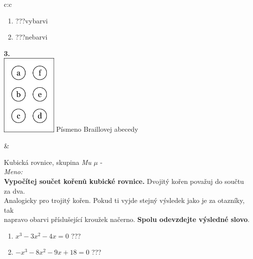 \documentclass[10pt]{report}
\begin{document}
\begin{tabular}{c:c}
\begin{minipage}[c][99mm][t]{0.49\linewidth}
\begin{center}
\begin{minipage}{0.77\linewidth}
\begin{center}
\begin{varwidth}{\textwidth}
\begin{enumerate}
\item \quad \dotfill\; ???\;\dotfill \quad vybarvi
\item \quad \dotfill\; ???\;\dotfill \quad nebarvi
\end{enumerate}
\end{varwidth}
\end{center}
\end{minipage}
\begin{minipage}{0.20\linewidth}
\begin{center}
{\Huge\bfseries 3.} \\[2mm]
\includegraphics[height=40mm]{../images/braille.png}
{\small Písmeno Braillovej abecedy}
\end{center}
\end{minipage}
\end{center}
\end{minipage}
&
\begin{minipage}[c][99mm][t]{0.49\linewidth}
\begin{center}
\vspace{7mm}
{\huge Kubická rovnice, skupina \textit{Mu $\mu$} -}\\[4.5mm]
\textit{Meno:}\phantom{xxxxxxxxxxxxxxxxxxxxxxxxxxxxxxxxxxxxxxxxxxxxxxxxxxxxxxxxxxxxxxxxx}\\[3.5mm]
\textbf{Vypočítej součet kořenů kubické rovnice.} Dvojitý kořen považuj do součtu za dva.\\Analogicky pro trojitý kořen. Pokud ti vyjde stejný výsledek jako je za otazníky, tak\\napravo obarvi příslušející kroužek načerno. \textbf{Spolu odevzdejte výsledné slovo}.\\[3mm]
\begin{minipage}{0.77\linewidth}
\begin{center}
\begin{varwidth}{\textwidth}
\begin{enumerate}
\large
\item $x^3-3x^2-4x=0$\quad \dotfill\; ???\;\dotfill {}
\item $-x^3-8x^2-9x+18=0$\quad \dotfill\; ???\;\dotfill {}

\end{enumerate}
\end{varwidth}
\end{center}
\end{minipage}
\end{center}
\end{minipage}
\end{tabular}
\end{document}
